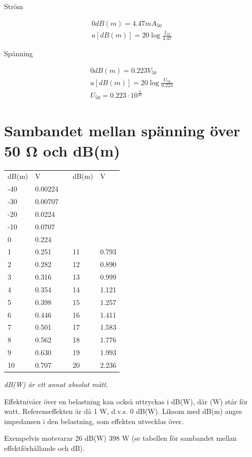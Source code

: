 Ström

\begin{gather*}
  0 dB(m) = 4.47 mA_{50} \\
  a [dB(m)] = 20 \log\frac{I_{50}}{4.47}
\end{gather*}

Spänning

\begin{gather*}
  0 dB(m) = 0.223 V_{50} \\
  a [dB(m)] = 20 \log\frac{U_{50}}{0.223} \\
  U_{50} = 0.223 \cdot 10^{\frac{a}{20}}
\end{gather*}

\section{Sambandet mellan spänning över 50 Ω och dB(m)}
\begin{tabular}{l|lp{1cm}l|l}
  dB(m) & V & & dB(m) & V \\
  \cline{1-2} \cline{4-5}
  -40 & 0.00224 & & & \\
  -30 & 0.00707 & & & \\
  -20 & 0.0224  & & & \\
  -10 & 0.0707  & & & \\
  0   & 0.224   & & & \\
  1   & 0.251   & & 11 & 0.793 \\
  2   & 0.282   & & 12 & 0.890 \\
  3   & 0.316   & & 13 & 0.999 \\
  4   & 0.354   & & 14 & 1.121 \\
  5   & 0.398   & & 15 & 1.257 \\
  6   & 0.446   & & 16 & 1.411 \\
  7   & 0.501   & & 17 & 1.583 \\
  8   & 0.562   & & 18 & 1.776 \\
  9   & 0.630   & & 19 & 1.993 \\
  10  & 0.707   & & 20 & 2.236 \\
\end{tabular}

\emph{dB(W) är ett annat absolut mått.}

Effektnivåer över en belastning kan också uttryckas i dB(W), där (W)
står för watt.  Referenseffekten är då 1 W, d.v.s. 0 dB(W).  Liksom med
dB(m) anges impedansen i den belastning, som effekten utvecklas över.

Exempelvis motsvarar 26 dB(W) 398 W (se tabellen för sambandet mellan
effektförhållande och dB).

